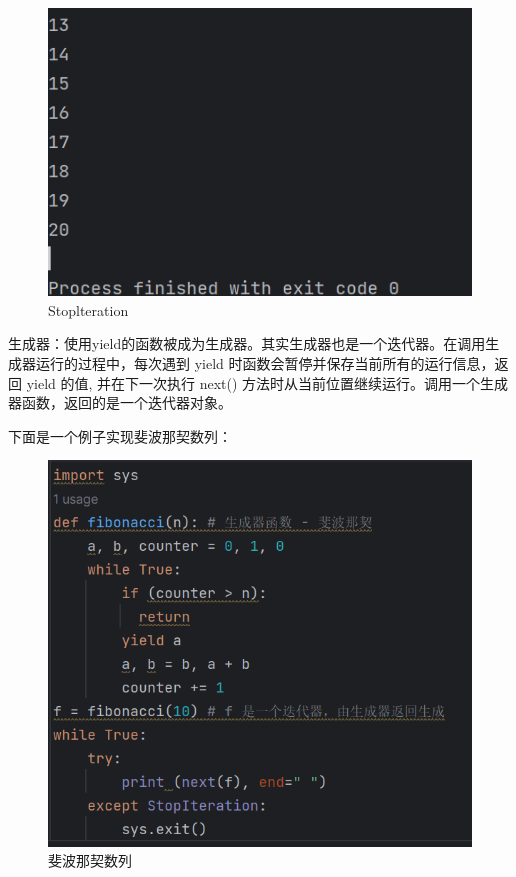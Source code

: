 \documentclass{ctexart}
\begin{document}
    \begin{figure}[H]
    	\centering
    	\includegraphics[scale=0.5]{3.58}
    	\caption{Stoplteration}
    \end{figure}

	生成器：使用yield的函数被成为生成器。其实生成器也是一个迭代器。在调用生成器运行的过程中，每次遇到 yield 时函数会暂停并保存当前所有的运行信息，返回 yield 的值, 并在下一次执行 next() 方法时从当前位置继续运行。调用一个生成器函数，返回的是一个迭代器对象。
	
	下面是一个例子实现斐波那契数列：
	
	\begin{figure}[H]
		\centering
		\includegraphics[scale=0.5]{3.59}
		\caption{斐波那契数列}
	\end{figure}
	
\end{document}
